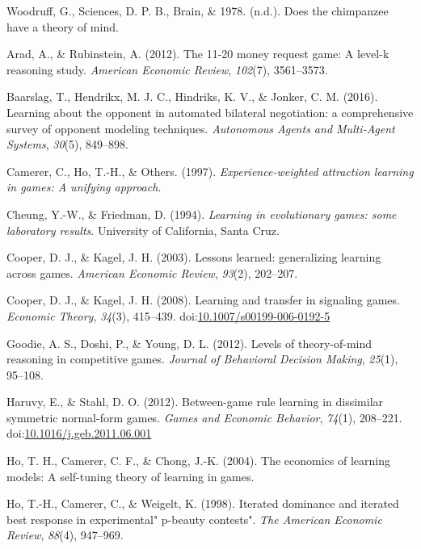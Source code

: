 \documentclass[man,floatsintext]{apa6}
\begin{document}
\leavevmode\hypertarget{ref-Woodruff}{}%
Woodruff, G., Sciences, D. P. B., Brain, \& 1978. (n.d.). Does the chimpanzee have a theory of mind.

\leavevmode\hypertarget{ref-arad201211}{}%
Arad, A., \& Rubinstein, A. (2012). The 11-20 money request game: A level-k reasoning study. \emph{American Economic Review}, \emph{102}(7), 3561--3573.

\leavevmode\hypertarget{ref-baarslag2016learning}{}%
Baarslag, T., Hendrikx, M. J. C., Hindriks, K. V., \& Jonker, C. M. (2016). Learning about the opponent in automated bilateral negotiation: a comprehensive survey of opponent modeling techniques. \emph{Autonomous Agents and Multi-Agent Systems}, \emph{30}(5), 849--898.

\leavevmode\hypertarget{ref-camerer1997experience}{}%
Camerer, C., Ho, T.-H., \& Others. (1997). \emph{Experience-weighted attraction learning in games: A unifying approach}.

\leavevmode\hypertarget{ref-cheung1994learning}{}%
Cheung, Y.-W., \& Friedman, D. (1994). \emph{Learning in evolutionary games: some laboratory results}. University of California, Santa Cruz.

\leavevmode\hypertarget{ref-cooper2003lessons}{}%
Cooper, D. J., \& Kagel, J. H. (2003). Lessons learned: generalizing learning across games. \emph{American Economic Review}, \emph{93}(2), 202--207.

\leavevmode\hypertarget{ref-Cooper2008}{}%
Cooper, D. J., \& Kagel, J. H. (2008). Learning and transfer in signaling games. \emph{Economic Theory}, \emph{34}(3), 415--439. doi:\href{https://doi.org/10.1007/s00199-006-0192-5}{10.1007/s00199-006-0192-5}

\leavevmode\hypertarget{ref-goodie2012levels}{}%
Goodie, A. S., Doshi, P., \& Young, D. L. (2012). Levels of theory-of-mind reasoning in competitive games. \emph{Journal of Behavioral Decision Making}, \emph{25}(1), 95--108.

\leavevmode\hypertarget{ref-Haruvy2012}{}%
Haruvy, E., \& Stahl, D. O. (2012). Between-game rule learning in dissimilar symmetric normal-form games. \emph{Games and Economic Behavior}, \emph{74}(1), 208--221. doi:\href{https://doi.org/10.1016/j.geb.2011.06.001}{10.1016/j.geb.2011.06.001}

\leavevmode\hypertarget{ref-ho2004economics}{}%
Ho, T. H., Camerer, C. F., \& Chong, J.-K. (2004). The economics of learning models: A self-tuning theory of learning in games.

\leavevmode\hypertarget{ref-ho1998iterated}{}%
Ho, T.-H., Camerer, C., \& Weigelt, K. (1998). Iterated dominance and iterated best response in experimental" p-beauty contests". \emph{The American Economic Review}, \emph{88}(4), 947--969.
\end{document}

